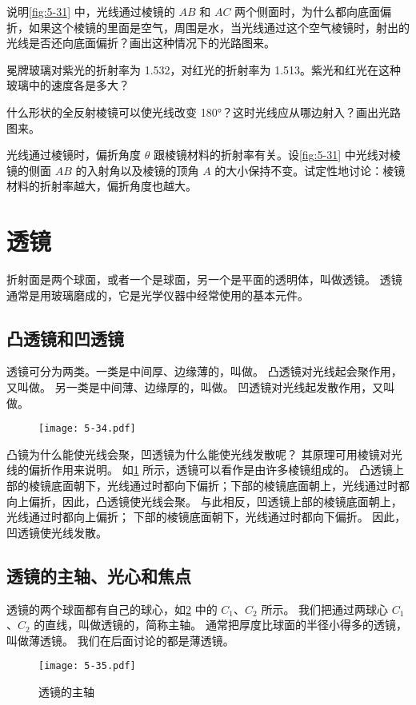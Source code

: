 \begin{Practice}
\begin{question}
  \item 说明\cref{fig:5-31} 中，光线通过棱镜的 $AB$ 和 $AC$ 两个侧面时，为什么都向底面偏折，如果这个棱镜的里面是空气，周围是水，当光线通过这个空气棱镜时，射出的光线是否还向底面偏折？画出这种情况下的光路图来。
  \item 冕牌玻璃对紫光的折射率为 1.532，对红光的折射率为 1.513。紫光和红光在这种玻璃中的速度各是多大？
  \item 什么形状的全反射棱镜可以使光线改变 \ang{180}？这时光线应从哪边射入？画出光路图来。
  \item 光线通过棱镜时，偏折角度 $\theta$ 跟棱镜材料的折射率有关。设\cref{fig:5-31}  中光线对棱镜的侧面 $AB$ 的入射角以及棱镜的顶角 $A$ 的大小保持不变。试定性地讨论：棱镜材料的折射率越大，偏折角度也越大。
\end{question}
\end{Practice}

\section{透镜}
折射面是两个球面，或者一个是球面，另一个是平面的透明体，叫做透镜。
透镜通常是用玻璃磨成的，它是光学仪器中经常使用的基本元件。

\subsection{凸透镜和凹透镜}

透镜可分为两类。一类是中间厚、边缘薄的，叫做。
凸透镜对光线起会聚作用，又叫做。
另一类是中间薄、边缘厚的，叫做。
凹透镜对光线起发散作用，又叫做。
\begin{figure}
  \texttt{[image: 5-34.pdf]}
  \caption{}\label{fig:5-34}
\end{figure}

凸镜为什么能使光线会聚，凹透镜为什么能使光线发散呢？
其原理可用棱镜对光线的偏折作用来说明。
如\cref{fig:5-34} 所示，透镜可以看作是由许多棱镜组成的。
凸透镜上部的棱镜底面朝下，光线通过时都向下偏折；下部的棱镜底面朝上，光线通过时都向上偏折，因此，凸透镜使光线会聚。
与此相反，凹透镜上部的棱镜底面朝上，光线通过时都向上偏折；
下部的棱镜底面朝下，光线通过时都向下偏折。
因此，凹透镜使光线发散。

\subsection{透镜的主轴、光心和焦点}
透镜的两个球面都有自己的球心，如\cref{fig:5-35} 中的 $C_1$、$C_2$ 所示。
我们把通过两球心 $C_1$、$C_2$ 的直线，叫做透镜的，简称主轴。
通常把厚度比球面的半径小得多的透镜，叫做薄透镜。
我们在后面讨论的都是薄透镜。
\begin{figure}
  \texttt{[image: 5-35.pdf]}
  \caption{透镜的主轴}\label{fig:5-35}
\end{figure}

